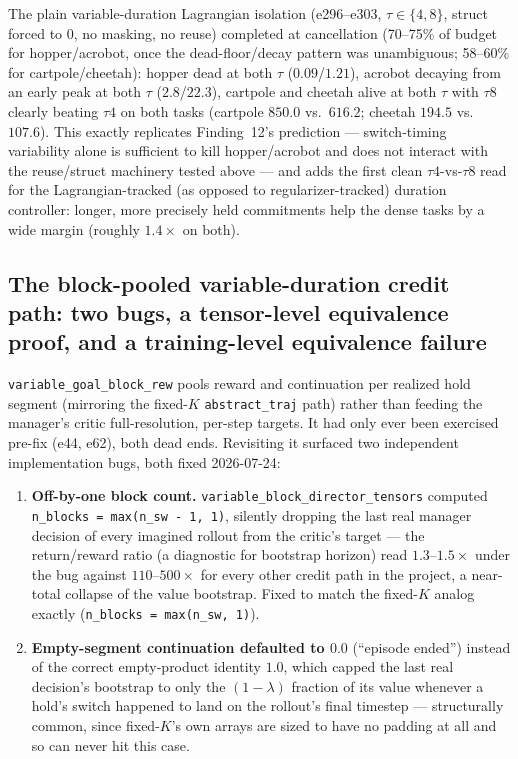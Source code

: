 \documentclass[10pt]{article}
\begin{document}
The plain variable-duration Lagrangian isolation (e296--e303, $\tau\in\{4,8\}$,
struct forced to $0$, no masking, no reuse) completed at cancellation
(70--75\% of budget for hopper/acrobot, once the dead-floor/decay pattern
was unambiguous; 58--60\% for cartpole/cheetah): hopper dead at both $\tau$
($0.09$/$1.21$), acrobot decaying from an early peak at both $\tau$
($2.8$/$22.3$), cartpole and cheetah alive at both $\tau$ with $\tau8$
clearly beating $\tau4$ on both tasks (cartpole $850.0$ vs.\ $616.2$;
cheetah $194.5$ vs.\ $107.6$). This exactly replicates Finding~12's
prediction --- switch-timing variability alone is sufficient to kill
hopper/acrobot and does not interact with the reuse/struct machinery tested
above --- and adds the first clean $\tau4$-vs-$\tau8$ read for the
Lagrangian-tracked (as opposed to regularizer-tracked) duration controller:
longer, more precisely held commitments help the dense tasks by a wide
margin (roughly $1.4\times$ on both).

\subsection{The block-pooled variable-duration credit path: two bugs, a
tensor-level equivalence proof, and a training-level equivalence failure}
\label{sec:blockpooled}

\texttt{variable\_goal\_block\_rew} pools reward and continuation per
realized hold segment (mirroring the fixed-$K$ \texttt{abstract\_traj} path)
rather than feeding the manager's critic full-resolution, per-step targets.
It had only ever been exercised pre-fix (e44, e62), both dead ends. Revisiting
it surfaced two independent implementation bugs, both fixed 2026-07-24:

\begin{enumerate}
\item \textbf{Off-by-one block count.} \texttt{variable\_block\_director\_tensors}
computed \texttt{n\_blocks = max(n\_sw - 1, 1)}, silently dropping the last
real manager decision of every imagined rollout from the critic's target ---
the return/reward ratio (a diagnostic for bootstrap horizon) read
$1.3$--$1.5\times$ under the bug against $110$--$500\times$ for every other
credit path in the project, a near-total collapse of the value bootstrap.
Fixed to match the fixed-$K$ analog exactly (\texttt{n\_blocks = max(n\_sw, 1)}).
\item \textbf{Empty-segment continuation defaulted to $0.0$} (``episode
ended'') instead of the correct empty-product identity $1.0$, which capped
the last real decision's bootstrap to only the $(1{-}\lambda)$ fraction of
its value whenever a hold's switch happened to land on the rollout's final
timestep --- structurally common, since fixed-$K$'s own arrays are sized to
have no padding at all and so can never hit this case.
\end{enumerate}
\end{document}
